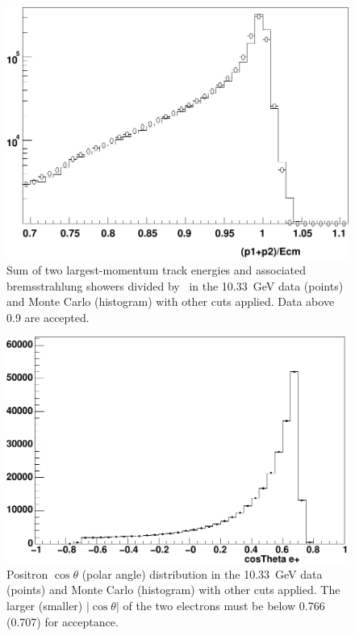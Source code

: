 \documentclass{cornell}
\begin{document}
\begin{figure}[p]
  \begin{center}
    \includegraphics[width=0.7\linewidth]{plots/eeagreementa}
  \end{center}
  \caption{\label{eeagreementc} Sum of two largest-momentum track
  energies and associated bremsstrahlung showers divided by \ecm\ in
  the 10.33~GeV data (points) and Monte Carlo (histogram) with other
  cuts applied.  Data above 0.9 are accepted.}
\end{figure}

\begin{figure}[p]
  \begin{center}
    \includegraphics[width=0.7\linewidth]{plots/eeagreementd}
  \end{center}
  \caption{\label{eeagreementd} Positron $\cos\theta$ (polar angle)
  distribution in the 10.33~GeV data (points) and Monte Carlo
  (histogram) with other cuts applied.  The larger (smaller)
  $|\cos\theta|$ of the two electrons must be below 0.766 (0.707) for
  acceptance.}
\end{figure}
\end{document}
